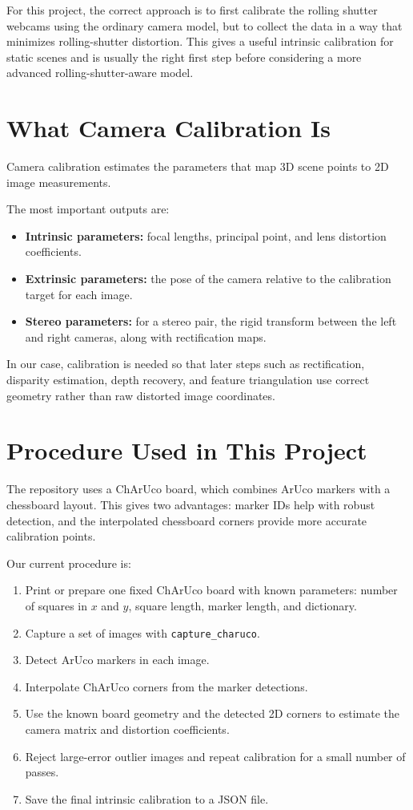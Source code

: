 \documentclass[11pt]{article}
\begin{document}
For this project, the correct approach is to first calibrate the rolling
shutter webcams using the ordinary camera model, but to collect the data in
a way that minimizes rolling-shutter distortion. This gives a useful
intrinsic calibration for static scenes and is usually the right first step
before considering a more advanced rolling-shutter-aware model.

\section{What Camera Calibration Is}

Camera calibration estimates the parameters that map 3D scene points to 2D
image measurements.

The most important outputs are:

\begin{itemize}
\item \textbf{Intrinsic parameters:} focal lengths, principal point, and
      lens distortion coefficients.
\item \textbf{Extrinsic parameters:} the pose of the camera relative to the
      calibration target for each image.
\item \textbf{Stereo parameters:} for a stereo pair, the rigid transform
      between the left and right cameras, along with rectification maps.
\end{itemize}

In our case, calibration is needed so that later steps such as rectification,
disparity estimation, depth recovery, and feature triangulation use correct
geometry rather than raw distorted image coordinates.

\section{Procedure Used in This Project}

The repository uses a ChArUco board, which combines ArUco markers with a
chessboard layout. This gives two advantages: marker IDs help with robust
detection, and the interpolated chessboard corners provide more accurate
calibration points.

Our current procedure is:

\begin{enumerate}
\item Print or prepare one fixed ChArUco board with known parameters:
      number of squares in $x$ and $y$, square length, marker length, and
      dictionary.
\item Capture a set of images with \texttt{capture\_charuco}.
\item Detect ArUco markers in each image.
\item Interpolate ChArUco corners from the marker detections.
\item Use the known board geometry and the detected 2D corners to estimate
      the camera matrix and distortion coefficients.
\item Reject large-error outlier images and repeat calibration for a small
      number of passes.
\item Save the final intrinsic calibration to a JSON file.
\end{enumerate}
\end{document}
